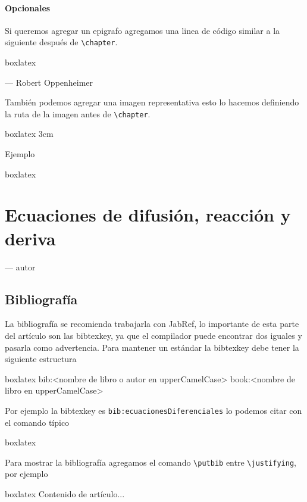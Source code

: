 {	\subsubsection{Opcionales}
	Si queremos agregar un epigrafo agregamos una linea de código similar a la siguiente después de \verb|\chapter|.
	\begin{tcblisting}{boxlatex}
		\epigraph{}{--- \textup{Robert Oppenheimer}}
	\end{tcblisting}
	También podemos agregar una imagen representativa esto lo hacemos definiendo la ruta de la imagen antes de \verb|\chapter|.
	\begin{tcblisting}{boxlatex}
		 {3cm}
	\end{tcblisting}
	Ejemplo 
	\begin{tcblisting}{boxlatex}
	{\justifying
		\chapter{Ecuaciones de difusión, reacción y deriva}\label{art:EcuacionesDeDifusiónReacción}
		\epigraph{}{--- \textup{autor}}
		\begin{abstract}
			contenido
		\end{abstract}
	}\cleanalldata
	\end{tcblisting}
	\newpage
	\section{Bibliografía}
	La bibliografía se recomienda trabajarla con JabRef, lo importante de esta parte del artículo son las bibtexkey, ya que el compilador puede encontrar dos iguales y pasarla como advertencia. Para mantener un estándar la bibtexkey debe tener la siguiente estructura
	\begin{tcblisting}{boxlatex}
	 	bib:<nombre de libro o autor en upperCamelCase> 
	 	book:<nombre de libro en upperCamelCase> 
	\end{tcblisting}
	Por ejemplo la bibtexkey es \verb|bib:ecuacionesDiferenciales|
	lo podemos citar con el comando típico
	\begin{tcblisting}{boxlatex}
		\cite{bib:ecuacionesDiferenciales}
	\end{tcblisting}
	Para mostrar la bibliografía agregamos el comando \verb|\putbib| entre \verb|\justifying|, por ejemplo
	\begin{tcblisting}{boxlatex}
		{\justifying
		Contenido de artículo... 
		\putbib
		}\cleanalldata
	\end{tcblisting}
	\newpage
}
